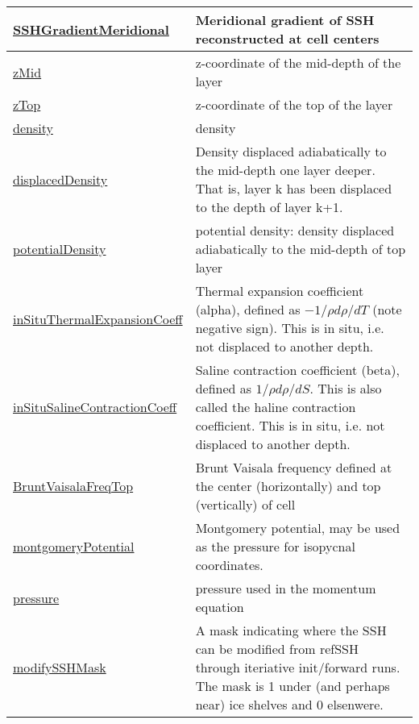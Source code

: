 {\begin{center}
\begin{longtable}{| p{2.0in} | p{4.0in} |}
    \hline
    \hyperref[subsec:var_sec_diagnostics_SSHGradientMeridional]{SSHGradientMeridional} & Meridional gradient of SSH reconstructed at cell centers \\
    \hline
    \hyperref[subsec:var_sec_diagnostics_zMid]{zMid} & z-coordinate of the mid-depth of the layer \\
    \hline
    \hyperref[subsec:var_sec_diagnostics_zTop]{zTop} & z-coordinate of the top of the layer \\
    \hline
    \hyperref[subsec:var_sec_diagnostics_density]{density} & density \\
    \hline
    \hyperref[subsec:var_sec_diagnostics_displacedDensity]{displacedDensity} & Density displaced adiabatically to the mid-depth one layer deeper.  That is, layer k has been displaced to the depth of layer k+1. \\
    \hline
    \hyperref[subsec:var_sec_diagnostics_potentialDensity]{potentialDensity} & potential density: density displaced adiabatically to the mid-depth of top layer \\
    \hline
    \hyperref[subsec:var_sec_diagnostics_inSituThermalExpansionCoeff]{inSituThermalExpansionCoeff} & Thermal expansion coefficient (alpha), defined as $-1/\rho d\rho/dT$ (note negative sign).  This is in situ, i.e. not displaced to another depth. \\
    \hline
    \hyperref[subsec:var_sec_diagnostics_inSituSalineContractionCoeff]{inSituSalineContractionCoeff} & Saline contraction coefficient (beta), defined as $1/\rho d\rho/dS$.  This is also called the haline contraction coefficient.  This is in situ, i.e. not displaced to another depth. \\
    \hline
    \hyperref[subsec:var_sec_diagnostics_BruntVaisalaFreqTop]{BruntVaisalaFreqTop} & Brunt Vaisala frequency defined at the center (horizontally) and top (vertically) of cell \\
    \hline
    \hyperref[subsec:var_sec_diagnostics_montgomeryPotential]{montgomeryPotential} & Montgomery potential, may be used as the pressure for isopycnal coordinates. \\
    \hline
    \hyperref[subsec:var_sec_diagnostics_pressure]{pressure} & pressure used in the momentum equation \\
    \hline
    \hyperref[subsec:var_sec_diagnostics_modifySSHMask]{modifySSHMask} & A mask indicating where the SSH can be modified from refSSH through iteriative init/forward runs.  The mask is 1 under (and perhaps near) ice shelves and 0 elsenwere. \\

\end{longtable}
\end{center}}
